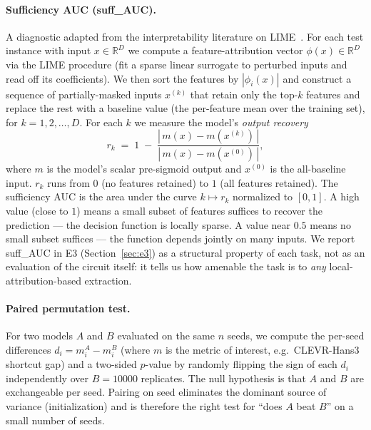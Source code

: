 \documentclass{article}
\newcommand{\R}{\mathbb{R}}
\begin{document}
\paragraph{Sufficiency AUC (suff\_AUC).}
A diagnostic adapted from the interpretability literature on LIME~\citep{ribeiro2016should}.
For each test instance with input $x \in \R^{D}$ we compute a feature-attribution vector $\phi(x) \in \R^{D}$ via the LIME procedure (fit a sparse linear surrogate to perturbed inputs and read off its coefficients).
We then sort the features by $|\phi_i(x)|$ and construct a sequence of partially-masked inputs $x^{(k)}$ that retain only the top-$k$ features and replace the rest with a baseline value (the per-feature mean over the training set), for $k = 1, 2, \ldots, D$.
For each $k$ we measure the model's \emph{output recovery}
\begin{equation*}
  r_k \;=\; 1 \;-\; \frac{\left|\,m(x) - m(x^{(k)})\,\right|}{\left|\,m(x) - m(x^{(0)})\,\right|},
\end{equation*}
where $m$ is the model's scalar pre-sigmoid output and $x^{(0)}$ is the all-baseline input.
$r_k$ runs from $0$ (no features retained) to $1$ (all features retained).
The sufficiency AUC is the area under the curve $k \mapsto r_k$ normalized to $[0,1]$.
A high value (close to $1$) means a small subset of features suffices to recover the prediction --- the decision function is locally sparse.
A value near $0.5$ means no small subset suffices --- the function depends jointly on many inputs.
We report suff\_AUC in E3 (Section~\ref{sec:e3}) as a structural property of each task, not as an evaluation of the circuit itself: it tells us how amenable the task is to \emph{any} local-attribution-based extraction.

\paragraph{Paired permutation test.}
For two models $A$ and $B$ evaluated on the same $n$ seeds, we compute the per-seed differences $d_i = m_i^A - m_i^B$ (where $m$ is the metric of interest, e.g.\ CLEVR-Hans3 shortcut gap) and a two-sided $p$-value by randomly flipping the sign of each $d_i$ independently over $B = 10000$ replicates.
The null hypothesis is that $A$ and $B$ are exchangeable per seed.
Pairing on seed eliminates the dominant source of variance (initialization) and is therefore the right test for ``does $A$ beat $B$'' on a small number of seeds.

\end{document}
